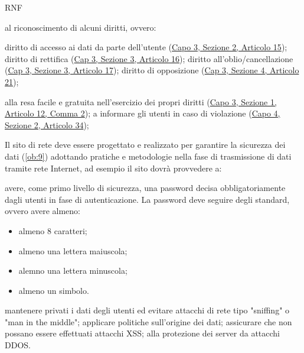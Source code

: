 \begin{listaPersonale}{RNF}
\begin{listaPersonale2}{}
         al riconoscimento di alcuni diritti, ovvero:
        \begin{listaPersonale3}{}
             diritto di accesso ai dati da parte dell'utente (\href{https://eur-lex.europa.eu/legal-content/IT/TXT/?uri=uriserv:OJ.L_.2016.119.01.0001.01.ITA&toc=OJ:L:2016:119:TOC#d1e2520-1-1}{Capo 3, Sezione 2, Articolo 15});
             diritto di rettifica (\href{https://eur-lex.europa.eu/legal-content/IT/TXT/?uri=uriserv:OJ.L_.2016.119.01.0001.01.ITA&toc=OJ:L:2016:119:TOC#d1e2606-1-1}{Cap 3, Sezione 3, Articolo 16});
             diritto all'oblio/cancellazione (\href{https://eur-lex.europa.eu/legal-content/IT/TXT/?uri=uriserv:OJ.L_.2016.119.01.0001.01.ITA&toc=OJ:L:2016:119:TOC#d1e2613-1-1}{Cap 3, Sezione 3, Articolo 17});
             diritto di opposizione (\href{https://eur-lex.europa.eu/legal-content/IT/TXT/?uri=uriserv:OJ.L_.2016.119.01.0001.01.ITA&toc=OJ:L:2016:119:TOC#d1e2810-1-1}{Cap 3, Sezione 4, Articolo 21});
        \end{listaPersonale3}

         alla resa facile e gratuita nell'esercizio dei propri diritti (\href{https://eur-lex.europa.eu/legal-content/IT/TXT/?uri=uriserv:OJ.L_.2016.119.01.0001.01.ITA&toc=OJ:L:2016:119:TOC#d1e2189-1-1}{Capo 3, Sezione 1, Articolo 12, Comma 2});
         a informare gli utenti in caso di violazione (\href{https://eur-lex.europa.eu/legal-content/IT/TXT/?uri=uriserv:OJ.L_.2016.119.01.0001.01.ITA&toc=OJ:L:2016:119:TOC#d1e3497-1-1}{Capo 4, Sezione 2, Articolo 34});
    \end{listaPersonale2}


     Il sito di rete deve essere progettato e realizzato per garantire la sicurezza dei dati (\ref{ob:9}) adottando pratiche e metodologie nella fase di trasmissione di dati tramite rete Internet, ad esempio il sito dovrà provvedere a:
    \begin{listaPersonale2}{}
         avere, come primo livello di sicurezza, una password decisa obbligatoriamente dagli utenti in fase di autenticazione. La password deve seguire degli standard, ovvero avere almeno: 
        \begin{itemize}
            \item almeno 8 caratteri;
            \item almeno una lettera maiuscola; 
            \item alemno una lettera minuscola; 
            \item almeno un simbolo.
        \end{itemize}
         mantenere privati i dati degli utenti ed evitare attacchi di rete tipo "sniffing" o "man in the middle";
         applicare politiche sull'origine dei dati;
         assicurare che non possano essere effettuati attacchi XSS;
         alla protezione dei server da attacchi DDOS.
    \end{listaPersonale2}


\end{listaPersonale}
